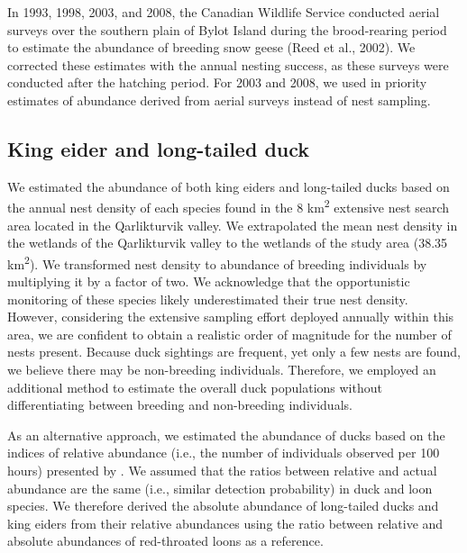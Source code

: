 \documentclass[a4paper,twoside,10pt]{article}
\begin{document}
In 1993, 1998, 2003, and 2008, the Canadian Wildlife Service conducted aerial surveys over the southern plain of Bylot Island during the brood-rearing period to estimate the abundance of breeding snow geese (Reed et al., 2002). We corrected these estimates with the annual nesting success, as these surveys were conducted after the hatching period. For 2003 and 2008, we used in priority estimates of abundance derived from aerial surveys instead of nest sampling.

\subsection{King eider and long-tailed duck}
We estimated the abundance of both king eiders and long-tailed ducks based on the annual nest density of each species found in the 8 km\textsuperscript{2} extensive nest search area located in the Qarlikturvik valley. We extrapolated the mean nest density in the wetlands of the Qarlikturvik valley to the wetlands of the study area (38.35 km\textsuperscript{2}). We transformed nest density to abundance of breeding individuals by multiplying it by a factor of two. We acknowledge that the opportunistic monitoring of these species likely underestimated their true nest density. However, considering the extensive sampling effort deployed annually within this area, we are confident to obtain a realistic order of magnitude for the number of nests present. Because duck sightings are frequent, yet only a few nests are found, we believe there may be non-breeding individuals. Therefore, we employed an additional method to estimate the overall duck populations without differentiating between breeding and non-breeding individuals. 

As an alternative approach, we estimated the abundance of ducks based on the indices of relative abundance (i.e., the number of individuals observed per 100 hours) presented by \citet{gauthier2024a}. We assumed that the ratios between relative and actual abundance are the same (i.e., similar detection probability) in duck and loon species. We therefore derived the absolute abundance of long-tailed ducks and king eiders from their relative abundances using the ratio between relative and absolute abundances of red-throated loons as a reference.
\end{document}
